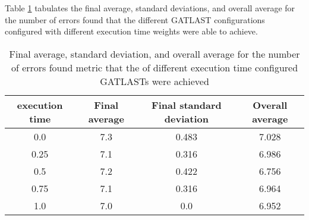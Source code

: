 Table \ref{tab:HP:GA:ExecutionTime:number of errors found} tabulates the final average, standard deviations, and overall average for the number of errors found that the different GATLAST configurations configured with different execution time weights were able to achieve.
\begin{table}[tbh!]
\centering
\begin{adjustbox}{trim=0cm 0cm 0cm 0cm, clip=true}
\begin{tabular}{|c|c|c|c|}
\hline
execution time & Final average & Final standard deviation & Overall average\\
\hline
0.0 & 7.3 & 0.483 & 7.028\\\hline
0.25 & 7.1 & 0.316 & 6.986\\\hline
0.5 & 7.2 & 0.422 & 6.756\\\hline
0.75 & 7.1 & 0.316 & 6.964\\\hline
1.0 & 7.0 & 0.0 & 6.952\\\hline
\end{tabular}
\end{adjustbox}
\caption{Final average, standard deviation, and overall average for the number of errors found metric that the of different execution time configured GATLASTs were achieved}
\label{tab:HP:GA:ExecutionTime:number of errors found}
\end{table}